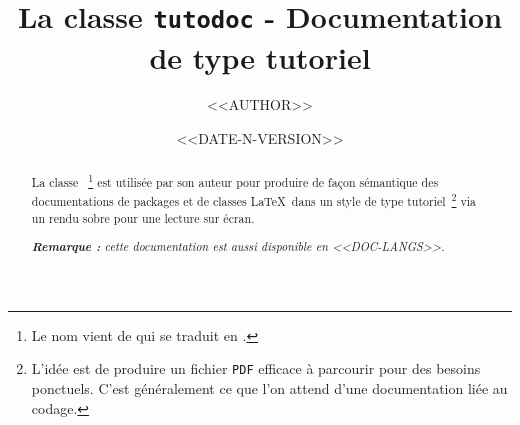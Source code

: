 \documentclass[12pt, a4paper]{tutodoc}
\begin{document}
\title{La classe \texttt{tutodoc} - Documentation de type tutoriel}
\author{<<AUTHOR>>}
\date{<<DATE-N-VERSION>>}

\maketitle


\begin{abstract}
    La classe \thisproj{}\,%
    \footnote{
        Le nom vient de  qui se traduit en .
    }
    est utilisée par son auteur pour produire de façon sémantique des documentations de packages et de classes \LaTeX\ dans un style de type tutoriel\,%
    \footnote{
        L'idée est de produire un fichier \texttt{PDF} efficace à parcourir pour des besoins ponctuels. C'est généralement ce que l'on attend d'une documentation liée au codage.
    }
    via un rendu sobre pour une lecture sur écran.

    \smallskip

	\noindent
    \emph{\textbf{Remarque :} cette documentation est aussi disponible en <<DOC-LANGS>>.}
\end{abstract}
\end{document}
